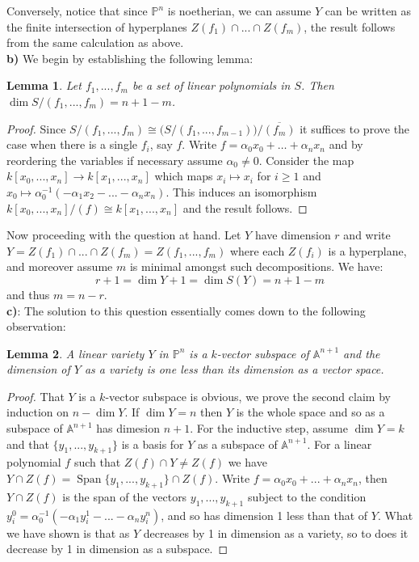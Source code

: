 \documentclass[12pt]{article}
\numberwithin{thm}{subsection}
\numberwithin{defn}{subsection}
\newtheorem{lemma}{Lemma}
\numberwithin{lemma}{subsection}
\numberwithin{example}{subsection}
\numberwithin{notation}{subsection}
\numberwithin{cor}{subsection}
\numberwithin{remark}{subsection}
\numberwithin{condition}{subsection}
\numberwithin{question}{subsection}
\numberwithin{construction}{subsection}
\numberwithin{construction}{subsection}
\numberwithin{construction}{subsection}
\newcommand{\bb}[1]{\mathbb{#1}}
\begin{document}
Conversely, notice that since $\bb{P}^n$ is noetherian, we can assume $Y$ can be written as the finite intersection of hyperplanes $Z(f_1) \cap ... \cap Z(f_m)$, the result follows from the same calculation as above.\\
\textbf{b)} We begin by establishing the following lemma:
\begin{lemma}
\label{lem:lin_codimension}
Let $f_1,...,f_m$ be a set of linear polynomials in $S$. Then $\operatorname{dim}S/(f_1,...,f_m) = n + 1 - m$.
\end{lemma}
\begin{proof}
Since $S/(f_1,...,f_m) \cong \big(S/(f_1,...,f_{m-1})\big)/\overline{(f_m)}$ it suffices to prove the case when there is a single $f_i$, say $f$. Write $f = \alpha_0 x_0 + \hdots + \alpha_n x_n$ and by reordering the variables if necessary assume $\alpha_0 \neq 0$. Consider the map $k[x_0,...,x_n] \to k[x_1,...,x_n]$ which maps $x_i \mapsto x_i$ for $i \geq 1$ and $x_0 \mapsto \alpha_0^{-1}(-\alpha_1x_2 - ... - \alpha_nx_n)$. This induces an isomorphism $k[x_0,...,x_n]/(f) \cong k[x_1,...,x_n]$ and the result follows.
\end{proof}
Now proceeding with the question at hand. Let $Y$ have dimension $r$ and write $Y = Z(f_1) \cap ... \cap Z(f_m) = Z(f_1,...,f_m)$ where each $Z(f_i)$ is a hyperplane, and moreover assume $m$ is minimal amongst such decompositions. We have:
\[r + 1 = \operatorname{dim}Y + 1 = \operatorname{dim}S(Y) = n + 1 - m\]
and thus $m = n - r$.\\
\textbf{c)}: The solution to this question essentially comes down to the following observation:
\begin{lemma}
\label{lem:vectorised_variety}
A linear variety $Y$ in $\bb{P}^n$ is a $k$-vector subspace of $\bb{A}^{n+1}$ and the dimension of $Y$ as a variety is one less than its dimension as a vector space.
\end{lemma}
\begin{proof}
That $Y$ is a $k$-vector subspace is obvious, we prove the second claim by induction on $n - \operatorname{dim}Y$. If $\operatorname{dim}Y = n$ then $Y$ is the whole space and so as a subspace of $\bb{A}^{n+1}$ has dimesion $n+1$. For the inductive step, assume $\operatorname{dim}Y = k$ and that $\lbrace y_1,...,y_{k+1}\rbrace$ is a basis for $Y$ as a subspace of $\bb{A}^{n+1}$. For a linear polynomial $f$ such that $Z(f) \cap Y \neq Z(f)$ we have $Y \cap Z(f) = \operatorname{Span}\lbrace y_1,...,y_{k+1}\rbrace \cap Z(f)$. Write $f = \alpha_0 x_0 + ... + \alpha_n x_n$, then $Y \cap Z(f)$ is the span of the vectors $y_1,...,y_{k+1}$ subject to the condition $y_i^0 = \alpha_0^{-1}(-\alpha_1 y_i^1 - ... - \alpha_n y_i^n)$, and so has dimension 1 less than that of $Y$. What we have shown is that as $Y$ decreases by 1 in dimension as a variety, so to does it decrease by 1 in dimension as a subspace.
\end{proof}
\end{document}

